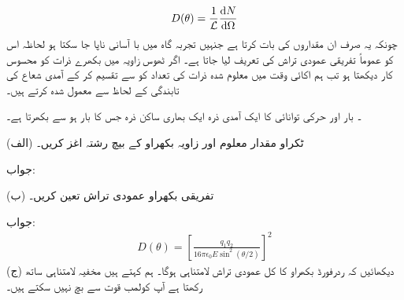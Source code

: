 \begin{align}
	D(\theta) = \frac{1}{\mathcal{L}}\frac{\dif N}{\dif\Omega}
\end{align}
چونکہ یہ صرف ان مقداروں کی بات کرتا ہے جنہیں تجربہ گاہ میں با آسانی ناپا جا سکتا ہو لحاظہ اس کو عموماً تفریقی عمودی تراش کی تعریف لیا جاتا ہے۔ اگر ٹھوس زاویہ  میں بکھرے ذرات کو محسوس کار دیکھتا ہو تب ہم اکائی وقت میں معلوم شدہ ذرات کی تعداد کو  سے تقسیم کر کے آمدی شعاع کی تابندگی کے لحاظ سے معمول شدہ کرتے ہیں۔

۔ بار  اور حرکی توانائی  کا ایک آمدی ذرہ ایک بھاری ساکن ذرہ جس کا بار  ہو 	سے بکھرتا ہے۔

(الف) ٹکراو مقدار معلوم اور زاویہ بکھراو کے بیچ رشتہ اغز کریں۔

جواب: 

(ب) تفریقی بکھراو عمودی تراش تعین کریں۔

جواب:
\begin{align}
	D(\theta)=\left[\frac{q_1q_2}{16\pi\epsilon_0E\sin^2(\theta/2)}\right]^2
\end{align}
(ج) دیکھائیں کہ ردرفورڈ بکھراو کا کل عمودی تراش لامتناہی ہوگا۔ ہم کہتے ہیں  مخفیہ لامتناہی ساتھ رکھتا ہے آپ کولمب قوت سے بچ نہیں سکتے ہیں۔

